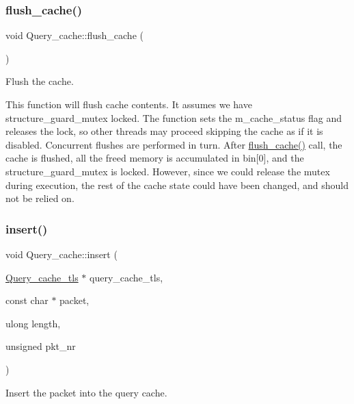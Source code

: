 \subsubsection{\texorpdfstring{flush\+\_\+cache()}{flush\_cache()}}
{\footnotesize\ttfamily void Query\+\_\+cache\+::flush\+\_\+cache (\begin{DoxyParamCaption}{ }\end{DoxyParamCaption})\hspace{0.3cm}{\ttfamily [protected]}}

Flush the cache.

This function will flush cache contents. It assumes we have \textquotesingle{}structure\+\_\+guard\+\_\+mutex\textquotesingle{} locked. The function sets the m\+\_\+cache\+\_\+status flag and releases the lock, so other threads may proceed skipping the cache as if it is disabled. Concurrent flushes are performed in turn. After \mbox{\hyperlink{classQuery__cache_aee3618ded5824d751e181940cc42cb9c}{flush\+\_\+cache()}} call, the cache is flushed, all the freed memory is accumulated in bin\mbox{[}0\mbox{]}, and the \textquotesingle{}structure\+\_\+guard\+\_\+mutex\textquotesingle{} is locked. However, since we could release the mutex during execution, the rest of the cache state could have been changed, and should not be relied on. \mbox{\label{classQuery__cache_a965d2c25ed3393f9331db62131a26491}} 
\subsubsection{\texorpdfstring{insert()}{insert()}}
{\footnotesize\ttfamily void Query\+\_\+cache\+::insert (\begin{DoxyParamCaption}\item[{\mbox{\hyperlink{structQuery__cache__tls}{Query\+\_\+cache\+\_\+tls}} $\ast$}]{query\+\_\+cache\+\_\+tls,  }\item[{const char $\ast$}]{packet,  }\item[{ulong}]{length,  }\item[{unsigned}]{pkt\+\_\+nr }\end{DoxyParamCaption})}

Insert the packet into the query cache. \mbox{\label{classQuery__cache_a052098d7f5bad1396ef0d40006364457}} 
